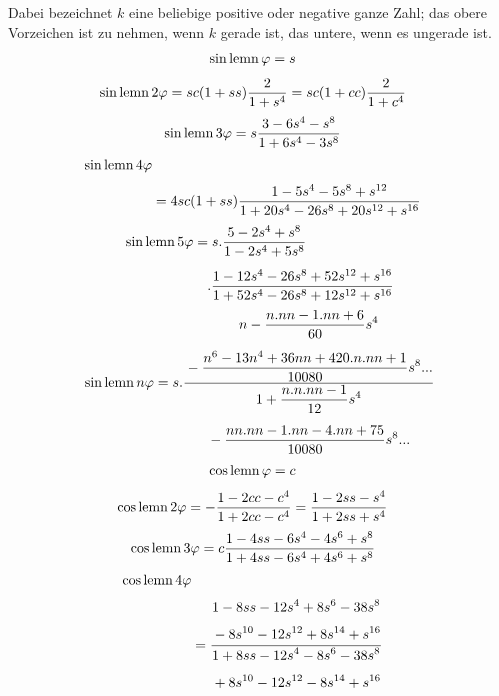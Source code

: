 Dabei bezeichnet $k$ eine beliebige positive oder negative ganze Zahl; das obere Vorzeichen ist zu nehmen, wenn $k$ gerade ist, das untere, wenn es ungerade ist.
\[
\begin{aligned}\operatorname{sin\,lemn}\varphi&=s\end{aligned}
\]
\[
\begin{aligned}\operatorname{sin\,lemn}2\varphi&=sc(1+ss)\dfrac2{1+s^4}=sc(1+cc)\dfrac2{1+c^4}\end{aligned}
\]
\[
\begin{aligned}\operatorname{sin\,lemn}3\varphi&=s\dfrac{3-6s^4-s^8}{1+6s^4-3s^8}\end{aligned}
\]
\[
\begin{aligned}\operatorname{sin\,lemn}4\varphi\\[3pt]&=4sc(1+ss)\dfrac{1-5s^4-5s^8+s^{12}}{1+20s^4-26s^8+20s^{12}+s^{16}}\end{aligned}
\]
\[
\begin{aligned}\operatorname{sin\,lemn}5\varphi&=s.\dfrac{5-2s^4+s^8}{1-2s^4+5s^8}\\[5pt]&\quad .\dfrac{1-12s^4-26s^8+52s^{12}+s^{16}}{1+52s^4-26s^8+12s^{12}+s^{16}}\end{aligned}
\]
\[
\operatorname{sin\,lemn} n\varphi=s.\dfrac{\begin{gathered}n-\dfrac{n.nn-1.nn+6}{60}s^4\\[5pt]{}-\dfrac{n^6-13n^4+36nn+420.n.nn+1}{10080}s^8\mathord{.}\mathord{.}\mathord{.}\end{gathered}}{\begin{gathered}1+\dfrac{n.n.nn-1}{12}s^4\\[5pt]{}-\dfrac{nn.nn-1.nn-4.nn+75}{10080}s^8\mathord{.}\mathord{.}\mathord{.}\end{gathered}}
\]
\[
\begin{aligned}\operatorname{cos\,lemn}\varphi&=c\end{aligned}
\]
\[
\begin{aligned}\operatorname{cos\,lemn}2\varphi&=-\dfrac{1-2cc-c^4}{1+2cc-c^4}=\dfrac{1-2ss-s^4}{1+2ss+s^4}\end{aligned}
\]
\[
\begin{aligned}\operatorname{cos\,lemn}3\varphi&=c\dfrac{1-4ss-6s^4-4s^6+s^8}{1+4ss-6s^4+4s^6+s^8}\end{aligned}
\]
\[
\begin{aligned}\operatorname{cos\,lemn}4\varphi\\[3pt]&=\dfrac{\begin{gathered}1-8ss-12s^4+8s^6-38s^8\\[3pt]{}-8s^{10}-12s^{12}+8s^{14}+s^{16}\end{gathered}}{\begin{gathered}1+8ss-12s^4-8s^6-38s^8\\[3pt]{}+8s^{10}-12s^{12}-8s^{14}+s^{16}\end{gathered}}\end{aligned}
\]

